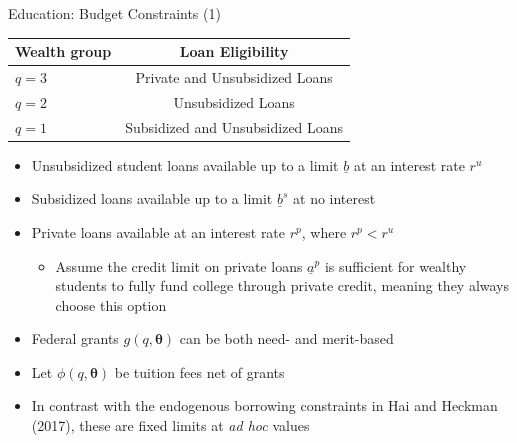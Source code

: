 \documentclass{beamer}
\begin{document}
\begin{frame}{Education: Budget Constraints (1)}
\begin{center}
  \begin{tabular}{ l | c }
     \hline
     Wealth group & Loan Eligibility \\ \hline
     $q=3$ & Private and Unsubsidized Loans  \\ 
     $q=2$ & Unsubsidized Loans	\\ 
     $q=1$ & Subsidized and Unsubsidized Loans	\\ 
     \hline          
  \end{tabular}
\end{center}
\begin{itemize}
  \item Unsubsidized student loans available up to a limit $\underline{b}$ at an 							interest rate $r^u$  
  \item Subsidized loans available up to a limit $\underline{b}^s$ at no interest
  \item Private loans available at an interest rate $r^p$, where $r^p<r^u$
  \begin{itemize}
  	\item Assume the credit limit on private loans $\underline{a}^p$ is sufficient for wealthy students 		  to fully fund college through private credit, meaning they always choose this option
  \end{itemize}
  \item Federal grants $g(q,\boldsymbol{\theta})$ can be both need- and merit-based
  \item Let $\phi(q,\boldsymbol{\theta})$ be tuition fees net of grants
  \item In contrast with the endogenous borrowing constraints in Hai and Heckman (2017), these are fixed 		 limits at \textit{ad hoc} values
\end{itemize}      
\end{frame} 
\end{document}
